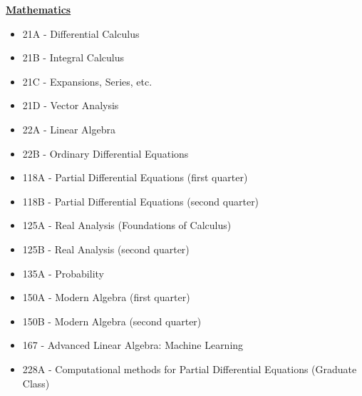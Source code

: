 \documentclass[11pt]{ltxdoc}
\begin{document}
\noindent
\textbf{\underline{Mathematics}}
\begin{itemize} 
	\item 21A - Differential Calculus
	\item 21B - Integral Calculus
	\item 21C - Expansions, Series, etc.
	\item 21D - Vector Analysis
	\item 22A - Linear Algebra
	\item 22B - Ordinary Differential Equations
	\item 118A - Partial Differential Equations   (first quarter)
	\item 118B - Partial Differential Equations   (second quarter)
	\item 125A - Real Analysis (Foundations of Calculus)
	\item 125B - Real Analysis (second quarter)
	\item 135A - Probability
	\item 150A - Modern Algebra (first quarter)
	\item 150B - Modern Algebra (second quarter)
	\item 167  - Advanced Linear Algebra: Machine Learning
	\item 228A - Computational methods for Partial Differential Equations (Graduate Class)
\end{itemize}
\end{document}
